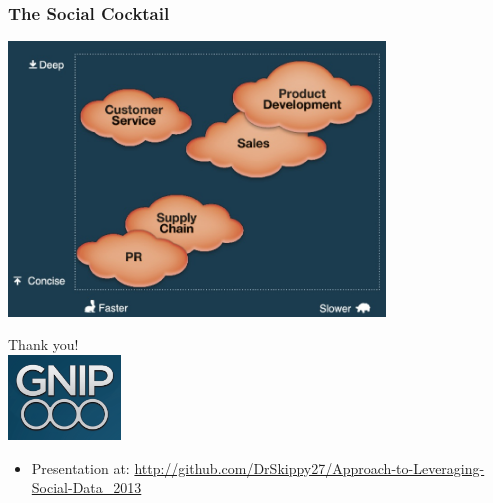 \documentclass{beamer}
\begin{document}
\begin{frame}
  \begin{center}\frametitle{The Social Cocktail}
    \includegraphics[width=10cm]{./imgs/slide15.jpg}
  \end{center}
\end{frame}


\begin{frame}
  \begin{center}
    {\Large Thank you!}  \\ [20pt]
    \includegraphics[width=3cm]{./imgs/logo.png} \\ [15pt]
    \begin{itemize}
    \item Presentation at: \url{http://github.com/DrSkippy27/Approach-to-Leveraging-Social-Data_2013}
    \end{itemize}
  \end{center}
\end{frame}
\end{document}
